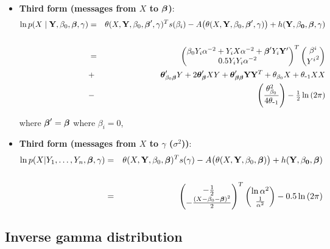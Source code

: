 \documentclass[11pt, oneside]{article}   	%
\numberwithin{figure}{section}
\numberwithin{equation}{section}
\numberwithin{table}{section}
\theoremstyle{definition}
\begin{document}
\begin{appendices}
\begin{itemize}
\item \textbf{Third form (messages from $X$ to $\boldsymbol \beta$)}:
\begin{eqnarray*}
\ln p(X\mid \mathbf{Y},\beta_0,\boldsymbol \beta,\gamma) &=& \theta(X,\mathbf Y,\beta_0,\boldsymbol \beta',\gamma)^T s(\beta_i) - A \big(\theta(X,\mathbf Y,\beta_0,\boldsymbol \beta',\gamma) \big) + h(\mathbf{Y,\beta_0,\boldsymbol \beta,\gamma})\\\\
&=&
\begin{pmatrix}
\beta_0 Y_i \alpha^{-2} + Y_i X \alpha^{-2} + \boldsymbol \beta' Y_i \mathbf Y' \\
0.5Y_iY_i \alpha^{-2}
\end{pmatrix}^T
\begin{pmatrix}
\beta^i\\
{Y^i}^2\\
\end{pmatrix}\\
&+& \boldsymbol \theta_{\beta_0\boldsymbol \beta}'Y + 2\boldsymbol \theta_{\boldsymbol \beta}'XY  + \boldsymbol \theta_{\boldsymbol \beta\boldsymbol \beta}'\mathbf Y\mathbf Y^T + \theta_{\beta_0}X + \theta_{\mbox{-}1}XX \\
&-& \left( \frac{\theta_{\beta_0}^2}{4\theta_{\mbox{-}1}} \right) - \tfrac{1}{2}\ln{(2\pi)}
\end{eqnarray*}

where $\boldsymbol \beta' = \boldsymbol \beta$ where $\beta_i = 0$,\\


\item \textbf{Third form (messages from $X$ to $\gamma$ ($\sigma^2$))}:
\begin{eqnarray*}
\ln p(X|Y_1,\ldots,Y_n,\boldsymbol \beta,\gamma) &=& \theta(X,\mathbf Y, \beta_0, \boldsymbol \beta)^T s(\gamma) - A \big(\theta(X,\mathbf Y,\beta_0,\boldsymbol \beta) \big) + h(\mathbf{\mathbf Y,\beta_0, \boldsymbol \beta})\\\\
&=&
\begin{pmatrix}
-\frac{1}{2}\\
-\frac{(X-\beta_0-\boldsymbol \beta)^2}{2}
\end{pmatrix}^T
\begin{pmatrix}
\ln{\alpha^2}\\
\frac{1}{\alpha^2}
\end{pmatrix}
 - 0.5\ln{(2\pi)}
\end{eqnarray*}


\end{itemize}


\subsection{Inverse gamma distribution}


\end{appendices}
\end{document}
